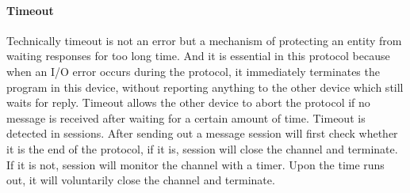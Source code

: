 \paragraph{Timeout}
Technically timeout is not an error but a mechanism of protecting an entity from waiting responses for too long time. And it is essential in this protocol because when an I/O error occurs during the protocol, it immediately terminates the program in this device, without reporting anything to the other device which still waits for reply. Timeout allows the other device to abort the protocol if no message is received after waiting for a certain amount of time. Timeout is detected in sessions. After sending out a message session will first check whether it is the end of the protocol, if it is, session will close the channel and terminate. If it is not, session will monitor the channel with a timer. Upon the time runs out, it will voluntarily close the channel and terminate.